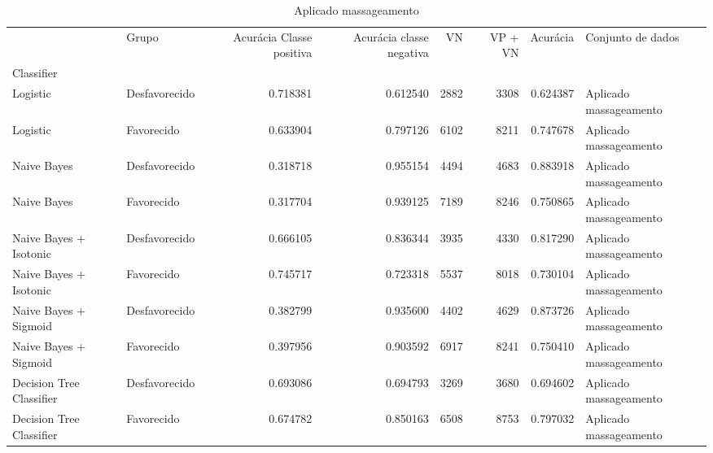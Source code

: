 \begin{table}
\centering
\caption{Aplicado massageamento}
\label{Aplicado massageamento 4}
\begin{tabular}{llrrrrrl}
\toprule
{} &          Grupo &  Acurácia Classe positiva &  Acurácia classe negativa &   VN  &  VP + VN  &  Acurácia &       Conjunto de dados \\
Classifier               &                &                           &                           &       &           &           &                         \\
\midrule
Logistic                 &  Desfavorecido &                  0.718381 &                  0.612540 &  2882 &      3308 &  0.624387 &  Aplicado massageamento \\
Logistic                 &     Favorecido &                  0.633904 &                  0.797126 &  6102 &      8211 &  0.747678 &  Aplicado massageamento \\
Naive Bayes              &  Desfavorecido &                  0.318718 &                  0.955154 &  4494 &      4683 &  0.883918 &  Aplicado massageamento \\
Naive Bayes              &     Favorecido &                  0.317704 &                  0.939125 &  7189 &      8246 &  0.750865 &  Aplicado massageamento \\
Naive Bayes + Isotonic   &  Desfavorecido &                  0.666105 &                  0.836344 &  3935 &      4330 &  0.817290 &  Aplicado massageamento \\
Naive Bayes + Isotonic   &     Favorecido &                  0.745717 &                  0.723318 &  5537 &      8018 &  0.730104 &  Aplicado massageamento \\
Naive Bayes + Sigmoid    &  Desfavorecido &                  0.382799 &                  0.935600 &  4402 &      4629 &  0.873726 &  Aplicado massageamento \\
Naive Bayes + Sigmoid    &     Favorecido &                  0.397956 &                  0.903592 &  6917 &      8241 &  0.750410 &  Aplicado massageamento \\
Decision Tree Classifier &  Desfavorecido &                  0.693086 &                  0.694793 &  3269 &      3680 &  0.694602 &  Aplicado massageamento \\
Decision Tree Classifier &     Favorecido &                  0.674782 &                  0.850163 &  6508 &      8753 &  0.797032 &  Aplicado massageamento \\
\bottomrule
\end{tabular}
\end{table}
